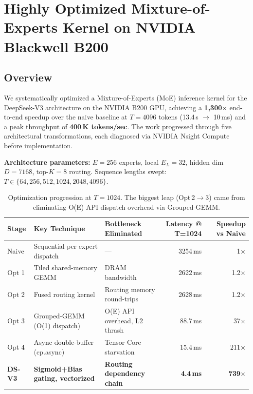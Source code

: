 \section{Highly Optimized Mixture-of-Experts Kernel on NVIDIA Blackwell B200}

\subsection{Overview}

We systematically optimized a Mixture-of-Experts (MoE) inference kernel for the DeepSeek-V3 architecture on the NVIDIA B200 GPU, achieving a \textbf{1,300$\times$} end-to-end speedup over the naive baseline at $T=4096$ tokens (13.4\,s $\to$ 10\,ms) and a peak throughput of \textbf{400\,K tokens/sec}. The work progressed through five architectural transformations, each diagnosed via NVIDIA Nsight Compute before implementation.

\textbf{Architecture parameters:} $E=256$ experts, local $E_L=32$, hidden dim $D=7168$, top-$K=8$ routing. Sequence lengths swept: $T \in \{64, 256, 512, 1024, 2048, 4096\}$.

\begin{table}[t]
\centering
\small
\begin{tabular}{lllrr}
\hline\hline
\textbf{Stage} & \textbf{Key Technique} & \textbf{Bottleneck Eliminated} & \textbf{Latency @ T=1024} & \textbf{Speedup vs Naive} \\
\hline
Naive    & Sequential per-expert dispatch & —                          & 3254\,ms & 1$\times$ \\
Opt 1    & Tiled shared-memory GEMM       & DRAM bandwidth             & 2622\,ms & 1.2$\times$ \\
Opt 2    & Fused routing kernel           & Routing memory round-trips & 2628\,ms & 1.2$\times$ \\
Opt 3    & Grouped-GEMM (O(1) dispatch)   & O(E) API overhead, L2 thrash & 88.7\,ms & 37$\times$ \\
Opt 4    & Async double-buffer (cp.async) & Tensor Core starvation     & 15.4\,ms & 211$\times$ \\
\textbf{DS-V3} & \textbf{Sigmoid+Bias gating, vectorized} & \textbf{Routing dependency chain} & \textbf{4.4\,ms} & \textbf{739$\times$} \\
\hline\hline
\end{tabular}
\caption{Optimization progression at $T=1024$. The biggest leap (Opt\,2$\to$3) came from eliminating O(E) API dispatch overhead via Grouped-GEMM.}
\end{table}

